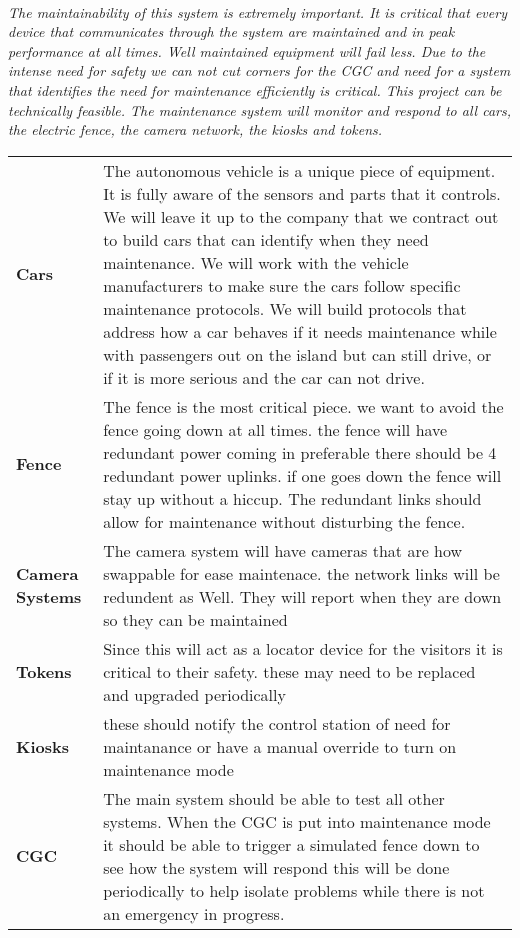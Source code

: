 \documentclass[12pt]{article}
\begin{document}
	\paragraph{} \textit{The maintainability of this system is extremely important. 
	It is critical that every device that communicates through the system are maintained 
	and in peak performance at all times. Well maintained equipment will fail less. Due to 
	the intense need for safety we can not cut corners for the CGC and need for a system 
	that identifies the need for maintenance efficiently is critical. This project can 
	be technically feasible. The maintenance system will monitor and respond to all cars, 
	the electric fence, the camera network, the kiosks and tokens.}
	
	\begin{table}[H]
		\begin{tabular}{lp{10cm}}
		\textbf{Cars} & The autonomous vehicle is a unique piece of equipment. It is fully 
		aware of the sensors and parts that it controls. We will leave it up to the 
		company that we contract out to build cars that can identify when they need 
		maintenance. We will work with the vehicle manufacturers to make sure the cars 
		follow specific maintenance protocols. We will build protocols that address how 
		a car behaves if it needs maintenance while with passengers out on the island but 
		can still drive, or if it is more serious and the car can not drive.\\
		\textbf{Fence} & The fence is the most critical piece. we want to avoid the fence going down at all times.
    	the fence will have redundant power coming in preferable there should be 4 redundant power uplinks. 
    	if one goes down the fence will stay up without a hiccup. The redundant links should allow for 
    	maintenance without disturbing the fence.\\
		\textbf{Camera Systems} & The camera system will have cameras that are how swappable for ease maintenace. the network links will be redundent as Well.
     	They will report when they are down so they can be maintained\\
		\textbf{Tokens} & Since this will act as a locator device for the visitors 
		it is critical to their safety. these may need to be replaced and upgraded periodically\\
		\textbf{Kiosks} & these should notify the control station of need for maintanance or have a manual override to turn on maintenance mode\\
		\textbf{CGC} & The main system should be able to test all other systems. When the CGC is 
		put into maintenance mode it should be able to trigger a simulated fence down to see how 
		the system will respond this will be done periodically to help isolate problems while 
		there is not an emergency in progress.\\		
		\end{tabular}
	\end{table}
\end{document}
